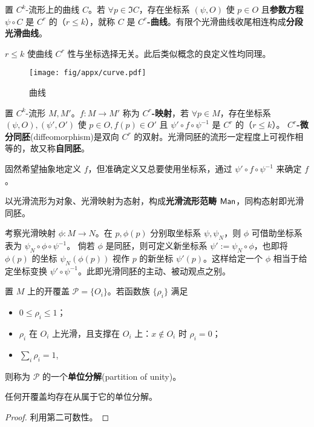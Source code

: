 \begin{definition}
    置 $C^k$-流形上的曲线 $C$。若 $\forall p\in \Im C$，存在坐标系 $(\psi,O)$ 使 $p\in O$ 且\textbf{参数方程} $\psi\circ C$ 是 $C^r$ 的（$r\leqslant k$），就称 $C$ 是 $C^r$\textbf{-曲线}。有限个光滑曲线收尾相连构成\textbf{分段光滑曲线}。
\end{definition}

\begin{remark}
    $r\leqslant k$ 使曲线 $C^r$ 性与坐标选择无关。此后类似概念的良定义性均同理。
\end{remark}

\begin{figure}[ht]
    \centering
    \texttt{[image: fig/appx/curve.pdf]}
    \caption{曲线}
\end{figure}

\begin{definition}
    置 $C^k$-流形 $M,M'$。$f:M\to M'$ 称为 $C^r$\textbf{-映射}，若 $\forall p\in M$，存在坐标系 $(\psi,O),(\psi',O')$ 使 $p\in O,f(p)\in O'$ 且 $\psi'\circ f\circ \psi^{-1}$ 是 $C^r$ 的（$r\leqslant k$）。
    \textbf{$C^r$-微分同胚}(diffeomorphism)是双向 $C^r$ 的双射。光滑同胚的流形一定程度上可视作相等的，故又称\textbf{自同胚}。
\end{definition}
\begin{remark}
    固然希望抽象地定义 $f$，但准确定义又总要使用坐标系，通过 $\psi'\circ f\circ \psi^{-1}$ 来确定 $f$。
\end{remark}

以光滑流形为对象、光滑映射为态射，构成\textbf{光滑流形范畴} $\mathsf{Man}$，同构态射即光滑同胚。

考察光滑映射 $\phi:M\to N$。在 $p,\phi(p)$ 分别取坐标系 $\psi,\psi_N$，则 $\phi$ 可借助坐标系表为 $\psi_N \circ\phi\circ\psi^{-1}$。
倘若 $\phi$ 是同胚，则可定义新坐标系 $\psi':=\psi_N\circ\phi$，也即将 $\phi(p)$ 的坐标 $\psi_N(\phi(p))$ 视作 $p$ 的新坐标 $\psi'(p)$。这样给定一个 $\phi$ 相当于给定坐标变换 $\psi' \circ\psi^{-1}$。此即光滑同胚的主动、被动观点之别。

\begin{definition}
    置 $M$ 上的开覆盖 $\mathscr P=\{O_i\}$。若函数族 $\{\rho_i\}$ 满足
    \begin{itemize}
        \item $0\leqslant\rho_i\leqslant 1$；
        \item $\rho_i$ 在 $O_i$ 上光滑，且支撑在 $O_i$ 上：$x\notin O_i$ 时 $\rho_i=0$；
        \item $\sum_i \rho_i=1$,
    \end{itemize}
    则称为 $\mathscr P$ 的一个\textbf{单位分解}(partition of unity)。
\end{definition}
\begin{theorem}
    任何开覆盖均存在从属于它的单位分解。
\end{theorem}
\begin{proof}
    利用第二可数性。
\end{proof}

